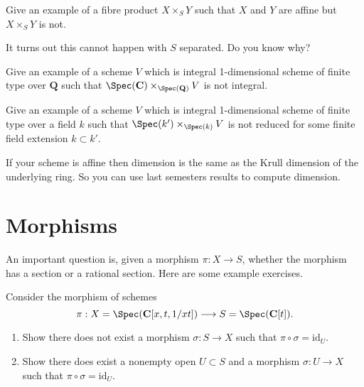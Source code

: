 \begin{exercise}
\label{exercise-fibre-product-affines-not-affine}
Give an example of a fibre product $X \times_S Y$ such that $X$ and $Y$
are affine but $X \times_S Y$ is not.
\end{exercise}

\begin{remark}
\label{remark-separated-base-fibre-product-affines-affine}
It turns out this cannot happen with $S$ separated. Do you know why?
\end{remark}

\begin{exercise}
\label{exercise-not-geometrically-integral}
Give an example of a scheme
$V$ which is integral 1-dimensional scheme of finite type
over ${\mathbf Q}$ such that
$\Spec({\mathbf C}) \times_{\Spec({\mathbf Q})} V$
is not integral.
\end{exercise}

\begin{exercise}
\label{exercise-not-geometrically-reduced}
Give an example of a scheme
$V$ which is integral 1-dimensional scheme of finite type
over a field $k$ such that $\Spec(k') \times_{\Spec(k)} V$
is not reduced for some finite field extension $k \subset k'$.
\end{exercise}

\begin{remark}
\label{remark-affine-dimension}
If your scheme is affine then dimension is the
same as the Krull dimension of the underlying ring. So you can
use last semesters results to compute dimension.
\end{remark}






\section{Morphisms}
\label{section-morphisms}

\noindent
An important question is, given a morphism $\pi : X \to S$,
whether the morphism has a section or a rational section.
Here are some example exercises.

\begin{exercise}
\label{exercise-no-section}
Consider the morphism of schemes
$$
\pi :
X = \Spec(\mathbf{C}[x, t, 1/xt])
\longrightarrow
S = \Spec(\mathbf{C}[t]).
$$
\begin{enumerate}
\item Show there does not exist a morphism $\sigma : S \to X$
such that $\pi \circ \sigma = \text{id}_U$.
\item Show there does exist a nonempty open $U \subset S$ and
a morphism $\sigma : U \to X$ such that $\pi \circ \sigma = \text{id}_U$.
\end{enumerate}
\end{exercise}

